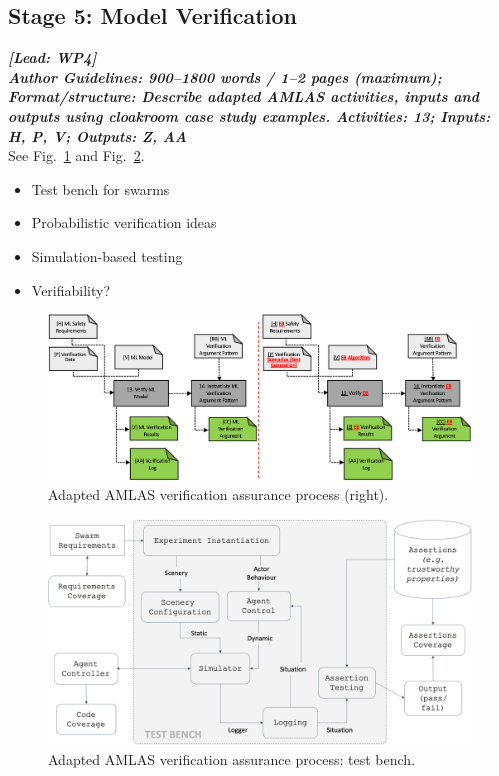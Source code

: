\documentclass[lettersize,journal]{IEEEtran}
\begin{document}
\subsection{Stage 5: Model Verification} \label{framework-stage5}
\noindent \textbf{\textit{[Lead:  WP4]}}\\ 
\noindent\textbf{\textit{Author Guidelines: 900–1800 words / 1–2 pages (maximum); \\Format/structure: Describe adapted AMLAS activities, inputs and outputs using cloakroom case study examples. Activities: 13; Inputs: H, P, V; Outputs: Z, AA}}\\
See Fig.~\ref{amlas-a-stage5} and Fig.~\ref{amlas-a-testbench}.	
\begin{itemize}
	\item Test bench for swarms
	\item Probabilistic verification ideas
	\item Simulation-based testing
	\item Verifiability?
\end{itemize}
\begin{figure}
	\centering
	\includegraphics[width=1.0\textwidth]{figures/amlas-a-stage5.png}
	\caption{Adapted AMLAS verification assurance process (right).}
	\label{amlas-a-stage5}
\end{figure}
\begin{figure}
	\centering
	\includegraphics[width=1.0\textwidth]{figures/verification-testbench.png}
	\caption{Adapted AMLAS verification assurance process: test bench.}
	\label{amlas-a-testbench}
\end{figure}
\end{document}
